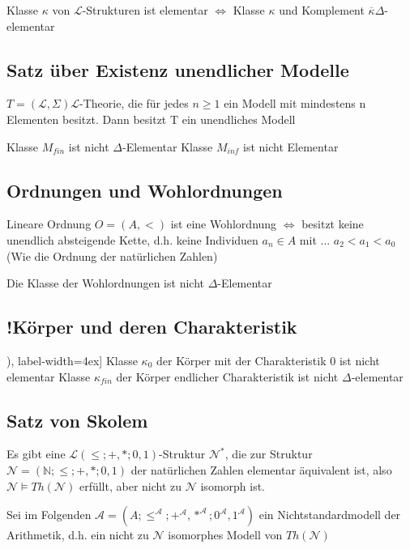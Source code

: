 \documentclass[12pt,a4paper]{article} %
\begin{document}
	Klasse $\kappa$ von $\mathcal{L}$-Strukturen ist elementar $\Leftrightarrow$ Klasse $\kappa$ und Komplement $\overline{\kappa} \Delta$-elementar 
	
	\subsection{Satz über Existenz unendlicher Modelle}
	$T = (\mathcal{L}, \Sigma) \mathcal{L}$-Theorie, die für jedes $n \ge 1$ ein Modell mit mindestens n Elementen besitzt. Dann besitzt T ein unendliches Modell 
	
	\begin{tasks}
		\task Klasse $M_{fin}$ ist nicht $\Delta$-Elementar
		\task Klasse $M_{inf}$ ist nicht Elementar
	\end{tasks} 

	\subsection{Ordnungen und Wohlordnungen}
	Lineare Ordnung $O = (A, <)$ ist eine Wohlordnung $\Leftrightarrow$ besitzt keine unendlich absteigende Kette, d.h. keine Individuen $a_n \in A$ mit ... $a_2 < a_1 < a_0$ (Wie die Ordnung der natürlichen Zahlen)
	
	Die Klasse der Wohlordnungen ist nicht $\Delta$-Elementar
	
	\subsection{!Körper und deren Charakteristik}
	\begin{tasks}[counter-format=(tsk[r]), label-width=4ex]
		\task Klasse $\kappa_0$ der Körper mit der Charakteristik 0 ist nicht elementar
		\task Klasse $\kappa_{fin}$ der Körper endlicher Charakteristik ist nicht $\Delta$-elementar
	\end{tasks}

	\subsection{Satz von Skolem}
	Es gibt eine $\mathcal{L}(\le; +, *; 0, 1)$-Struktur $\mathcal{N}^*$, die zur Struktur $\mathcal{N} = (\mathbb{N}; \le; +, *; 0, 1)$ der natürlichen Zahlen elementar äquivalent ist, also $\mathcal{N} \vDash Th(\mathcal{N})$ erfüllt, aber nicht zu $\mathcal{N}$ isomorph ist.
	
	Sei im Folgenden $\mathcal{A} = (A; \le^{\mathcal{A}}; +^{\mathcal{A}}, *^{\mathcal{A}}; 0^{\mathcal{A}}, 1^{\mathcal{A}})$ ein Nichtstandardmodell der Arithmetik, d.h. ein nicht zu $\mathcal{N}$ isomorphes Modell von $Th(\mathcal{N})$ 
	
\end{document}
